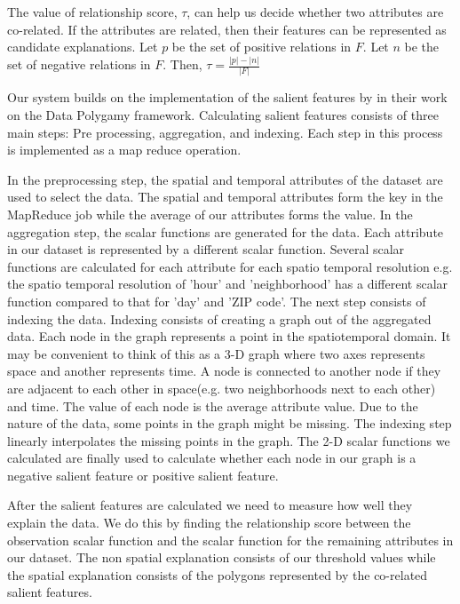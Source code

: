 The value of relationship score, $\tau$, can help us decide whether two attributes are co-related. If the attributes are related, then their features can be represented as candidate explanations. Let $p$ be the set of positive relations in $F$. Let $n$ be the set of negative relations in $F$. Then,
$\tau = \frac{|p|-|n|}{|F|}$


Our system builds on the implementation of the salient features by \cite{chirigati2016data} in their work on the Data Polygamy framework. Calculating salient features consists of three main steps: Pre processing, aggregation, and indexing. Each step in this process is implemented as a map reduce operation.

In the preprocessing step, the spatial and temporal attributes of the dataset are used to select the data. The spatial and temporal attributes form the key in the MapReduce job while the average of our attributes forms the value. In the aggregation step, the scalar functions are generated for the data. Each attribute in our dataset is represented by a different scalar function. Several scalar functions are calculated for each attribute for each spatio temporal resolution e.g. the spatio temporal resolution of 'hour' and 'neighborhood' has a different scalar function compared to that for 'day' and 'ZIP code'. The next step consists of indexing the data. Indexing consists of creating a graph out of the aggregated data. Each node in the graph represents a point in the spatiotemporal domain. It may be convenient to think of this as a 3-D graph where two axes represents space and another represents time. A node is connected to another node if they are adjacent to each other in space(e.g. two neighborhoods next to each other) and time. The value of each node is the average attribute value. Due to the nature of the data, some points in the graph might be missing. The indexing step linearly interpolates the missing points in the graph. The 2-D scalar functions we calculated are finally used to calculate whether each node in our graph is a negative salient feature or positive salient feature.

After the salient features are calculated we need to measure how well they explain the data. We do this by finding the relationship score between the observation scalar function and the scalar function for the remaining attributes in our dataset. The non spatial explanation consists of our threshold values while the spatial explanation consists of the polygons represented by the co-related salient features.
